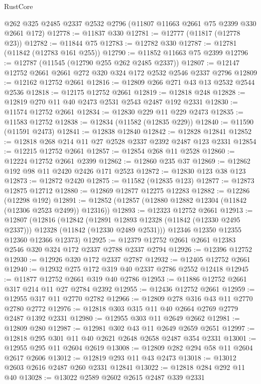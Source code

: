 \begin{lexlean}{RustCore}
\begin{coremodule}
    @262
    @325
    @2485
    @2337
    @2532
    @2796
    (@11807 @11663 @2661 @75 @2399 @330 @2661 @172)
@12778 := @11837 @330
@12781 := @12777 (@11817 (@12778 @23))
@12782 := @11844 @75
@12783 := @12782 @330
@12787 := @12781 (@11842 (@12783 @161 @255))
@12790 := @11852 @11663 @75 @2399
@12796 := @12787 (@11545 (@12790 @255 @262 @2485 @2337))
@12807 := @12147 @12752 @2661 @2661 @272 @320 @324 @172 @2532 @2546 @2337 @2796
@12809 := @12162 @12752 @2661
@12816 := @12809 @266 @271 @43 @13 @2532 @2544 @2536
@12818 := @12175 @12752 @2661
@12819 := @12818 @248
@12828 := @12819 @270 @11 @40 @2473 @2531 @2543 @2487 @192 @2331
@12830 := @11574 @12752 @2661
@12834 := @12830 @229 @11 @229 @2473
@12835 := @11583 @12752
@12838 := @12834 (@11582 (@12835 @229))
@12840 := @11590 (@11591 @2473)
@12841 := @12838 @12840
@12842 := @12828 @12841
@12852 := @12818 @268 @214 @11 @27 @2528 @2337 @2392 @2487 @123 @2331
@12854 := @12215 @12752 @2661
@12857 := @12854 @268 @11 @2528
@12860 := @12224 @12752 @2661 @2399
@12862 := @12860 @235 @37
@12869 := @12862 @192 @98 @11 @2420 @2426 @171 @2523
@12872 := @12830 @123 @38 @123
@12873 := @12872 @2420
@12875 := @11582 (@12835 @123)
@12877 := @12873 @12875 @12712
@12880 := @12869 @12877 @12275 @12283
@12882 := @12286 (@12298 @192)
@12891 := @12852 (@12857 (@12880 @12882 @12304 (@11842 (@12306 @2523 @2499)) @12316))
@12893 := @12323 @12752 @2661
@12913 := @12807
    (@12816
      (@12842
        (@12891 @12893 @12328 (@11842 (@12330 @2495 @2337)))
        @12328
        (@11842 (@12330 @2489 @2531)))
      @12346
      @12350
      @12355
      @12360
      @12366
      @12373)
@12925 := @12379 @12752 @2661 @2661 @12383 @2546 @320 @324 @172 @2337 @2788 @2337 @2794
@12926 := @12396 @12752
@12930 := @12926 @320 @172 @2337 @2787
@12932 := @12405 @12752 @2661
@12940 := @12932 @275 @172 @319 @40 @2337 @2786 @2552 @12418
@12945 := @11877 @12752 @2661 @319 @40 @2786
@12953 := @11886 @12752 @2661 @317 @214 @11 @27 @2784 @2392
@12955 := @12436 @12752 @2661
@12959 := @12955 @317 @11 @2770 @2782
@12966 := @12809 @278 @316 @43 @11 @2770 @2780 @2772
@12976 := @12818 @303 @315 @11 @40 @2664 @2769 @2779 @2487 @1392 @2331
@12980 := @12955 @303 @11 @2649 @2662
@12981 := @12809 @280
@12987 := @12981 @302 @43 @11 @2649 @2659 @2651
@12997 := @12818 @295 @301 @11 @40 @2621 @2648 @2658 @2487 @354 @2331
@13001 := @12955 @295 @11 @2604 @2619
@13008 := @12809 @282 @294 @58 @11 @2604 @2617 @2606
@13012 := @12819 @293 @11 @43 @2473
@13018 := @13012 @2603 @2616 @2487 @260 @2331 @12841
@13022 := @12818 @284 @292 @11 @40
@13028 := @13022 @2589 @2602 @2615 @2487 @339 @2331

\end{coremodule}
\end{lexlean}

